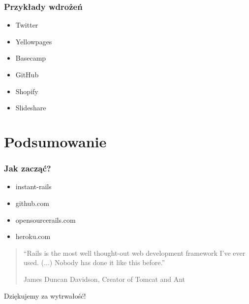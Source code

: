 \documentclass[12t]{beamer}
\begin{document}
\begin{frame}
  \frametitle{Przykłady wdrożeń}
  \begin{itemize}
  \item Twitter
  \item Yellowpages
  \item Basecamp
  \item GitHub
  \item Shopify
  \item Slideshare
  \end{itemize}
\end{frame}

\section{Podsumowanie}
\begin{frame}
  \frametitle{Jak zacząć?}
  \begin{itemize}
  \item instant-rails
  \item github.com
  \item opensourcerails.com
  \item heroku.com
  \end{itemize}
\end{frame}

\begin{frame}
  \begin{quote}
    “Rails is the most well thought-out web development framework I've
    ever used. (...) Nobody has done it like this before.”

    \begin{small}
      \hfill James Duncan Davidson, Creator of Tomcat and Ant
    \end{small}
  \end{quote}
\end{frame}

\begin{frame}
  \begin{center}
    \begin{Large}
      Dziękujemy za wytrwałość!
    \end{Large}
  \end{center}
\end{frame}
\end{document}
